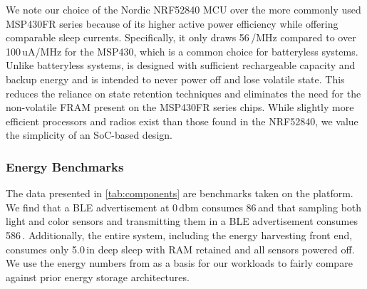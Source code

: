 We note our choice of the Nordic NRF52840 MCU over the more commonly used MSP430FR series
because of its higher active power efficiency while offering comparable sleep currents.
Specifically, it only draws 56\,\uA/MHz compared to over 100\,uA/MHz
for the MSP430, which is a common choice for batteryless systems. 
Unlike batteryless systems,
\name is designed with sufficient rechargeable capacity and backup energy and is intended to never power off and lose volatile state. 
This reduces the reliance on state retention techniques and eliminates the need for the non-volatile FRAM present on the MSP430FR series chips. 
While
slightly more efficient
processors and radios exist than those found in the NRF52840,
we value the simplicity of an SoC-based design. 

\subsubsection{Energy Benchmarks}
The data presented in \cref{tab:components} are benchmarks taken
on the \name platform. We find that a BLE advertisement at 0\,dbm consumes
86\,\uJ and that sampling both light and color sensors and transmitting
them in a BLE advertisement consumes 586\,\uJ. Additionally, the entire system, including
the energy harvesting front end, consumes only 5.0\,\uW in deep sleep with RAM
retained and all sensors powered off. We use the energy numbers from \name as a basis
for our workloads to fairly compare against prior energy storage architectures.
%
%
